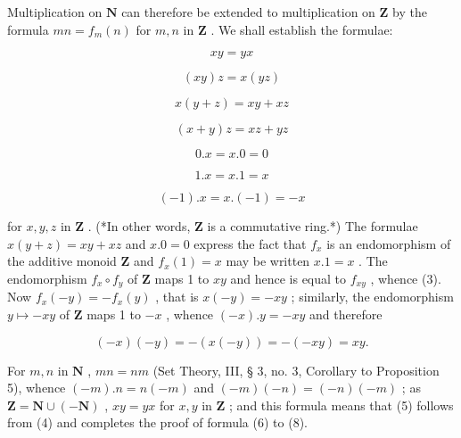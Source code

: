 Multiplication on \(\mathbf{N}\) can therefore be extended to multiplication on \(\mathbf{Z}\) by the formula \(mn = f_m(n)\) for \(m, n\) in \(\mathbf{Z}\) . We shall establish the formulae:

\[
x y = y x\tag{2}
\]

\[
(x y) z = x (y z)\tag{3}
\]

\[
x (y + z) = x y + x z\tag{4}
\]

\[
(x + y) z = x z + y z\tag{5}
\]

\[
0. x = x. 0 = 0\tag{6}
\]

\[
1. x = x. 1 = x\tag{7}
\]

\[
(- 1). x = x. (- 1) = - x\tag{8}
\]

for \(x, y, z\) in \(\mathbf{Z}\) . (*In other words, \(\mathbf{Z}\) is a commutative ring.*) The formulae \(x(y + z) = xy + xz\) and \(x.0 = 0\) express the fact that \(f_x\) is an endomorphism of the additive monoid \(\mathbf{Z}\) and \(f_{x}(1) = x\) may be written \(x.1 = x\) . The endomorphism \(f_{x} \circ f_{y}\) of \(\mathbf{Z}\) maps 1 to \(xy\) and hence is equal to \(f_{xy}\) , whence (3). Now \(f_{x}(-y) = -f_{x}(y)\) , that is \(x(-y) = -xy\) ; similarly, the endomorphism \(y \mapsto -xy\) of \(\mathbf{Z}\) maps 1 to \(-x\) , whence \((-x).y = -xy\) and therefore

\[
(- x) (- y) = - (x (- y)) = - (- x y) = x y.
\]

For \(m, n\) in \(\mathbf{N}\) , \(mn = nm\) (Set Theory, III, § 3, no. 3, Corollary to Proposition 5), whence \((-m).n = n(-m)\) and \((-m)(-n) = (-n)(-m)\) ; as \(\mathbf{Z} = \mathbf{N} \cup (-\mathbf{N})\) , \(xy = yx\) for \(x, y\) in \(\mathbf{Z}\) ; and this formula means that (5) follows from (4) and completes the proof of formula (6) to (8).

